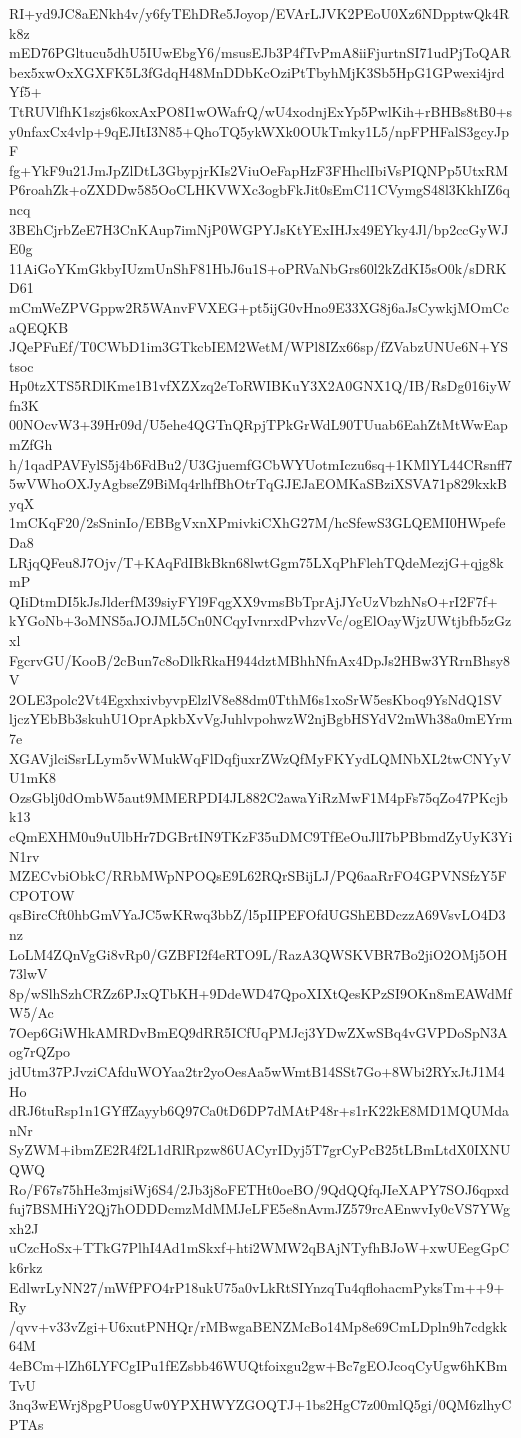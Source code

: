 RI+yd9JC8aENkh4v/y6fyTEhDRe5Joyop/EVArLJVK2PEoU0Xz6NDpptwQk4Rk8z
mED76PGltucu5dhU5IUwEbgY6/msusEJb3P4fTvPmA8iiFjurtnSI71udPjToQAR
bex5xwOxXGXFK5L3fGdqH48MnDDbKcOziPtTbyhMjK3Sb5HpG1GPwexi4jrdYf5+
TtRUVlfhK1szjs6koxAxPO8I1wOWafrQ/wU4xodnjExYp5PwlKih+rBHBs8tB0+s
y0nfaxCx4vlp+9qEJItI3N85+QhoTQ5ykWXk0OUkTmky1L5/npFPHFalS3gcyJpF
fg+YkF9u21JmJpZlDtL3GbypjrKIs2ViuOeFapHzF3FHhclIbiVsPIQNPp5UtxRM
P6roahZk+oZXDDw585OoCLHKVWXc3ogbFkJit0sEmC11CVymgS48l3KkhIZ6qncq
3BEhCjrbZeE7H3CnKAup7imNjP0WGPYJsKtYExIHJx49EYky4Jl/bp2ccGyWJE0g
11AiGoYKmGkbyIUzmUnShF81HbJ6u1S+oPRVaNbGrs60l2kZdKI5sO0k/sDRKD61
mCmWeZPVGppw2R5WAnvFVXEG+pt5ijG0vHno9E33XG8j6aJsCywkjMOmCcaQEQKB
JQePFuEf/T0CWbD1im3GTkcbIEM2WetM/WPl8IZx66sp/fZVabzUNUe6N+YStsoc
Hp0tzXTS5RDlKme1B1vfXZXzq2eToRWIBKuY3X2A0GNX1Q/IB/RsDg016iyWfn3K
00NOcvW3+39Hr09d/U5ehe4QGTnQRpjTPkGrWdL90TUuab6EahZtMtWwEapmZfGh
h/1qadPAVFylS5j4b6FdBu2/U3GjuemfGCbWYUotmIczu6sq+1KMlYL44CRsnff7
5wVWhoOXJyAgbseZ9BiMq4rlhfBhOtrTqGJEJaEOMKaSBziXSVA71p829kxkByqX
1mCKqF20/2sSninIo/EBBgVxnXPmivkiCXhG27M/hcSfewS3GLQEMI0HWpefeDa8
LRjqQFeu8J7Ojv/T+KAqFdIBkBkn68lwtGgm75LXqPhFlehTQdeMezjG+qjg8kmP
QIiDtmDI5kJsJlderfM39siyFYl9FqgXX9vmsBbTprAjJYcUzVbzhNsO+rI2F7f+
kYGoNb+3oMNS5aJOJML5Cn0NCqyIvnrxdPvhzvVc/ogElOayWjzUWtjbfb5zGzxl
FgcrvGU/KooB/2cBun7c8oDlkRkaH944dztMBhhNfnAx4DpJs2HBw3YRrnBhsy8V
2OLE3polc2Vt4EgxhxivbyvpElzlV8e88dm0TthM6s1xoSrW5esKboq9YsNdQ1SV
ljczYEbBb3skuhU1OprApkbXvVgJuhlvpohwzW2njBgbHSYdV2mWh38a0mEYrm7e
XGAVjlciSsrLLym5vWMukWqFlDqfjuxrZWzQfMyFKYydLQMNbXL2twCNYyVU1mK8
OzsGblj0dOmbW5aut9MMERPDI4JL882C2awaYiRzMwF1M4pFs75qZo47PKcjbk13
cQmEXHM0u9uUlbHr7DGBrtIN9TKzF35uDMC9TfEeOuJlI7bPBbmdZyUyK3YiN1rv
MZECvbiObkC/RRbMWpNPOQsE9L62RQrSBijLJ/PQ6aaRrFO4GPVNSfzY5FCPOTOW
qsBircCft0hbGmVYaJC5wKRwq3bbZ/l5pIIPEFOfdUGShEBDczzA69VsvLO4D3nz
LoLM4ZQnVgGi8vRp0/GZBFI2f4eRTO9L/RazA3QWSKVBR7Bo2jiO2OMj5OH73lwV
8p/wSlhSzhCRZz6PJxQTbKH+9DdeWD47QpoXIXtQesKPzSI9OKn8mEAWdMfW5/Ac
7Oep6GiWHkAMRDvBmEQ9dRR5ICfUqPMJcj3YDwZXwSBq4vGVPDoSpN3Aog7rQZpo
jdUtm37PJvziCAfduWOYaa2tr2yoOesAa5wWmtB14SSt7Go+8Wbi2RYxJtJ1M4Ho
dRJ6tuRsp1n1GYffZayyb6Q97Ca0tD6DP7dMAtP48r+s1rK22kE8MD1MQUMdanNr
SyZWM+ibmZE2R4f2L1dRlRpzw86UACyrIDyj5T7grCyPcB25tLBmLtdX0IXNUQWQ
Ro/F67s75hHe3mjsiWj6S4/2Jb3j8oFETHt0oeBO/9QdQQfqJIeXAPY7SOJ6qpxd
fuj7BSMHiY2Qj7hODDDcmzMdMMJeLFE5e8nAvmJZ579rcAEnwvIy0cVS7YWgxh2J
uCzcHoSx+TTkG7PlhI4Ad1mSkxf+hti2WMW2qBAjNTyfhBJoW+xwUEegGpCk6rkz
EdlwrLyNN27/mWfPFO4rP18ukU75a0vLkRtSIYnzqTu4qflohacmPyksTm++9+Ry
/qvv+v33vZgi+U6xutPNHQr/rMBwgaBENZMcBo14Mp8e69CmLDpln9h7cdgkk64M
4eBCm+lZh6LYFCgIPu1fEZsbb46WUQtfoixgu2gw+Bc7gEOJcoqCyUgw6hKBmTvU
3nq3wEWrj8pgPUosgUw0YPXHWYZGOQTJ+1bs2HgC7z00mlQ5gi/0QM6zlhyCPTAs
